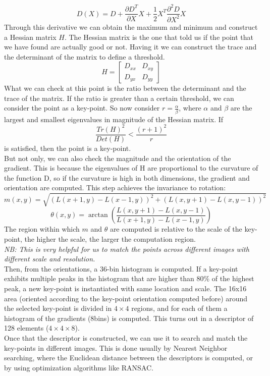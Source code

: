 \[
    D(X)=D + \frac{\partial D^T}{\partial X}X + \frac{1}{2}X^T\frac{\partial^2D}{\partial X^2}X
\]
Through this derivative we can obtain the maximum and minimum and construct a Hessian matrix $H$.
The Hessian matrix is the one that told us if the point that we have found are actually good or not.
Having it we can construct the trace and the determinant of the matrix to define a threshold.
\[
    H = \begin{bmatrix}
        D_{xx} & D_{xy} \\
        D_{yx} & D_{yy}
    \end{bmatrix}
\]
What we can check at this point is the ratio between the determinant and the trace of the matrix.
If the ratio is greater than a certain threshold, we can consider the point as a key-point.
So now consider $r = \frac{\alpha}{\beta}$, where $\alpha$ and $\beta$ are the largest and smallest eigenvalues in magnitude of the Hessian matrix.
If \[ \frac{Tr(H)^2}{Det(H)} < \frac{(r+1)^2}{r} \] is satisfied, then the point is a key-point.
\\
But not only, we can also check the magnitude and the orientation of the gradient.
This is because the eigenvalues of H are proportional to the curvature of the function D, so if the curvature is high in both dimensions, the gradient and orientation are computed.
This step achieves the invariance to rotation:
\[
    m(x,y) = \sqrt{(L(x+1,y)-L(x-1,y))^2 + (L(x,y+1)-L(x,y-1))^2}  
\]
\[
    \theta(x,y) = \arctan\left(\frac{L(x,y+1)-L(x,y-1)}{L(x+1,y)-L(x-1,y)}\right)
\]
The region within which $m$ and $\theta$ are computed is relative to the scale of the key-point, the higher the scale, the larger the computation region.
\\\textit{NB: This is very helpful for us to match the points across different images with different scale and resolution.}
\\
Then, from the orientations, a 36-bin histogram is computed. If a key-point exhibits multiple peaks in the histogram that are higher than $80\%$ of the highest peak, a new key-point is instantiated with same location and scale.
The 16x16 area (oriented according to the key-point orientation computed before) around the selected key-point is divided in $4\times4$ regions, and for each of them a histogram of the gradients (8bins) is computed.
This turns out in a descriptor of 128 elements ($4\times4\times8$).
\\
Once that the descriptor is constructed, we can use it to search and match the key-points in different images. This is done usually by Nearest Neighbor searching, where the Euclidean distance between the descriptors is computed, or by using optimization algorithms like RANSAC. 